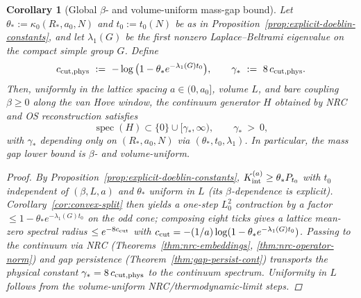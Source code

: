 \documentclass[11pt]{amsart}
\theoremstyle{plain}
\newtheorem{corollary}[theorem]{Corollary}
\theoremstyle{definition}
\theoremstyle{remark}
\begin{document}
\begin{corollary}[Global $\beta$- and volume-uniform mass-gap bound]\label{cor:global-uniform-gap}
Let $\theta_*:=\kappa_0(R_*,a_0,N)$ and $t_0:=t_0(N)$ be as in Proposition~\ref{prop:explicit-doeblin-constants}, and let $\lambda_1(G)$ be the first nonzero Laplace--Beltrami eigenvalue on the compact simple group $G$. Define
\[
  c_{\rm cut,phys}\ :=\ -\log\big(1-\theta_* e^{-\lambda_1(G) t_0}\big),\qquad \gamma_*\ :=\ 8\,c_{\rm cut,phys}.
\]
Then, uniformly in the lattice spacing $a\in(0,a_0]$, volume $L$, and bare coupling $\beta\ge 0$ along the van Hove window, the continuum generator $H$ obtained by NRC and OS reconstruction satisfies
\[
  \operatorname{spec}(H)\subset\{0\}\cup[\gamma_*,\infty),\qquad \gamma_*\ >\ 0,
\]
with $\gamma_*$ depending only on $(R_*,a_0,N)$ via $(\theta_*,t_0,\lambda_1)$. In particular, the mass gap lower bound is $\beta$- and volume-uniform.
\begin{proof}
By Proposition~\ref{prop:explicit-doeblin-constants}, $K_{\rm int}^{(a)}\ge \theta_* P_{t_0}$ with $t_0$ independent of $(\beta,L,a)$ and $\theta_*$ uniform in $L$ (its $\beta$-dependence is explicit). Corollary~\ref{cor:convex-split} then yields a one-step $L^2_0$ contraction by a factor $\le 1-\theta_* e^{-\lambda_1(G) t_0}$ on the odd cone; composing eight ticks gives a lattice mean-zero spectral radius $\le e^{-8 c_{\rm cut}}$ with $c_{\rm cut} = -(1/a)\log(1-\theta_* e^{-\lambda_1(G) t_0})$. Passing to the continuum via NRC (Theorems~\ref{thm:nrc-embeddings}, \ref{thm:nrc-operator-norm}) and gap persistence (Theorem~\ref{thm:gap-persist-cont}) transports the physical constant $\gamma_* = 8\,c_{\rm cut,phys}$ to the continuum spectrum. Uniformity in $L$ follows from the volume-uniform NRC/thermodynamic-limit steps.
\end{proof}
\end{corollary}
\end{document}
